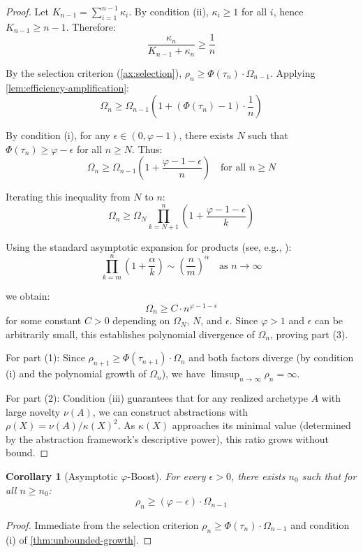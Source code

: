 \documentclass[11pt]{article}
\newtheorem{corollary}[theorem]{Corollary}
\theoremstyle{definition}
\theoremstyle{remark}
\begin{document}
\begin{proof}
Let $K_{n-1} = \sum_{i=1}^{n-1} \kappa_i$. By condition (ii), $\kappa_i \geq 1$ for all $i$, hence $K_{n-1} \geq n-1$. Therefore:
\[
\frac{\kappa_n}{K_{n-1} + \kappa_n} \geq \frac{1}{n}
\]

By the selection criterion (\cref{ax:selection}), $\rho_n \geq \Phi(\tau_n) \cdot \Omega_{n-1}$. Applying \cref{lem:efficiency-amplification}:
\[
\Omega_n \geq \Omega_{n-1} \left(1 + (\Phi(\tau_n) - 1) \cdot \frac{1}{n}\right)
\]

By condition (i), for any $\epsilon \in (0, \varphi - 1)$, there exists $N$ such that $\Phi(\tau_n) \geq \varphi - \epsilon$ for all $n \geq N$. Thus:
\[
\Omega_n \geq \Omega_{n-1} \left(1 + \frac{\varphi - 1 - \epsilon}{n}\right) \quad \text{for all } n \geq N
\]

Iterating this inequality from $N$ to $n$:
\[
\Omega_n \geq \Omega_N \prod_{k=N+1}^{n} \left(1 + \frac{\varphi - 1 - \epsilon}{k}\right)
\]

Using the standard asymptotic expansion for products (see, e.g., \cite{knuth1997art}):
\[
\prod_{k=m}^{n} \left(1 + \frac{\alpha}{k}\right) \sim \left(\frac{n}{m}\right)^\alpha \quad \text{as } n \to \infty
\]

we obtain:
\[
\Omega_n \geq C \cdot n^{\varphi - 1 - \epsilon}
\]
for some constant $C > 0$ depending on $\Omega_N$, $N$, and $\epsilon$. Since $\varphi > 1$ and $\epsilon$ can be arbitrarily small, this establishes polynomial divergence of $\Omega_n$, proving part (3).

For part (1): Since $\rho_{n+1} \geq \Phi(\tau_{n+1}) \cdot \Omega_n$ and both factors diverge (by condition (i) and the polynomial growth of $\Omega_n$), we have $\limsup_{n \to \infty} \rho_n = \infty$.

For part (2): Condition (iii) guarantees that for any realized archetype $A$ with large novelty $\nu(A)$, we can construct abstractions with $\rho(X) = \nu(A)/\kappa(X)^2$. As $\kappa(X)$ approaches its minimal value (determined by the abstraction framework's descriptive power), this ratio grows without bound.
\end{proof}

\begin{corollary}[Asymptotic $\varphi$-Boost]
\label{cor:phi-boost}
For every $\epsilon > 0$, there exists $n_0$ such that for all $n \geq n_0$:
\[
\rho_n \geq (\varphi - \epsilon) \cdot \Omega_{n-1}
\]
\end{corollary}

\begin{proof}
Immediate from the selection criterion $\rho_n \geq \Phi(\tau_n) \cdot \Omega_{n-1}$ and condition (i) of \cref{thm:unbounded-growth}.
\end{proof}
\end{document}

